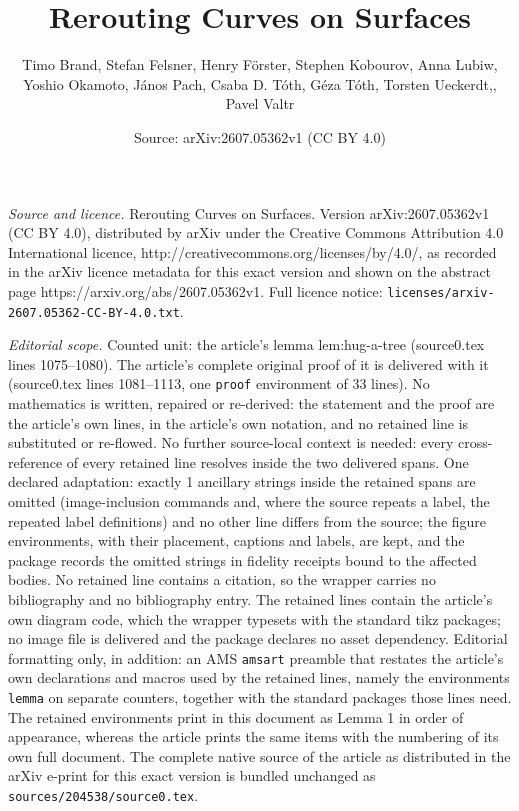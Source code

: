 \documentclass[10pt,a4paper]{amsart}
\title{Rerouting Curves on Surfaces}
\author{Timo Brand, Stefan Felsner, Henry F\"orster, Stephen Kobourov, Anna Lubiw, Yoshio Okamoto, J\'anos Pach, Csaba D. T\'oth, G\'eza T\'oth, Torsten Ueckerdt,, Pavel Valtr}
\date{Source: arXiv:2607.05362v1 (CC BY 4.0)}
\begin{document}
\maketitle

\noindent\emph{Source and licence.} Rerouting Curves on Surfaces. Version arXiv:2607.05362v1 (CC BY 4.0), distributed by arXiv under the Creative Commons Attribution 4.0 International licence, http://creativecommons.org/licenses/by/4.0/, as recorded in the arXiv licence metadata for this exact version and shown on the abstract page https://arxiv.org/abs/2607.05362v1. Full licence notice: \texttt{licenses/arxiv-2607.05362-CC-BY-4.0.txt}.\par\smallskip

\noindent\textit{Editorial scope.} Counted unit: the article's lemma lem:hug-a-tree (source0.tex lines 1075--1080). The article's complete original proof of it is delivered with it (source0.tex lines 1081--1113, one \texttt{proof} environment of 33 lines). No mathematics is written, repaired or re-derived: the statement and the proof are the article's own lines, in the article's own notation, and no retained line is substituted or re-flowed.  No further source-local context is needed: every cross-reference of every retained line resolves inside the two delivered spans.  One declared adaptation: exactly 1 ancillary strings inside the retained spans are omitted (image-inclusion commands and, where the source repeats a label, the repeated label definitions) and no other line differs from the source; the figure environments, with their placement, captions and labels, are kept, and the package records the omitted strings in fidelity receipts bound to the affected bodies.  No retained line contains a citation, so the wrapper carries no bibliography and no bibliography entry.  The retained lines contain the article's own diagram code, which the wrapper typesets with the standard tikz packages; no image file is delivered and the package declares no asset dependency.  Editorial formatting only, in addition: an AMS \texttt{amsart} preamble that restates the article's own declarations and macros used by the retained lines, namely the environments \texttt{lemma} on separate counters, together with the standard packages those lines need.  The retained environments print in this document as Lemma 1 in order of appearance, whereas the article prints the same items with the numbering of its own full document.  The complete native source of the article as distributed in the arXiv e-print for this exact version is bundled unchanged as \texttt{sources/204538/source0.tex}.
\end{document}
